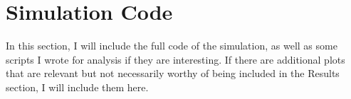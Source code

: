 \chapter{Simulation Code}

In this section, I will include the full code of the simulation, as well as some scripts I wrote for analysis if they are interesting. If there are additional plots that are relevant but not necessarily worthy of being included in the Results section, I will include them here.
